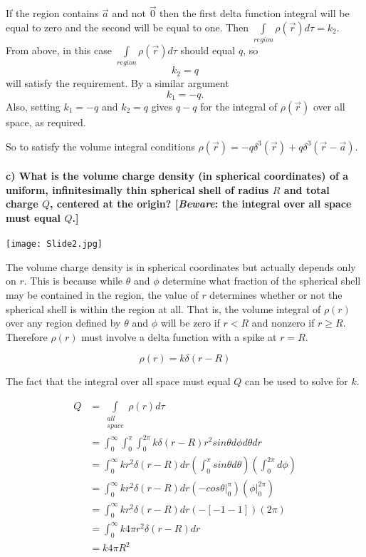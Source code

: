 \documentclass[12pt, oneside]{article}   	%
\begin{document}
If the region contains $\vec{a}$ and not $\vec{0}$ then the first delta function integral will be equal to zero and the second will be equal to one. Then $\int\limits_{region}\rho(\vec{r})d\tau=k_2$. From above, in this case $\int\limits_{region}\rho(\vec{r})d\tau$ should equal $q$, so 
\begin{equation}
k_2=q
\end{equation}
will satisfy the requirement. By a similar argument 
\begin{equation}
k_1=-q.
\end{equation}
Also, setting $k_1=-q$ and $k_2=q$ gives $q-q$ for the integral of $\rho(\vec{r})$ over all space, as required.

So to satisfy the volume integral conditions $\boxed{\rho({\vec{r}}) =-q\delta^3(\vec{r})+q\delta^3(\vec{r}-\vec{a})}$.
\paragraph*{\textbf{c) What is the volume charge density (in spherical coordinates) of a uniform, infinitesimally thin spherical shell of radius $R$ and total charge $Q$, centered at the origin? [\emph{Beware}: the integral over all space must equal $Q$.]}}

\begin{center}
\texttt{[image: Slide2.jpg]}
\end{center}

The volume charge density is in spherical coordinates but actually depends only on $r$. This is because while $\theta$ and $\phi$ determine what fraction of the spherical shell may be contained in the region, the value of $r$ determines whether or not the spherical shell is within the region at all. That is, the volume integral of $\rho(r)$ over any region defined by $\theta$ and $\phi$ will be zero if $r<R$ and nonzero if $r\geq R$. Therefore $\rho(r)$ must involve a delta function with a spike at $r=R$.

\begin{equation}
\rho(r)=k\delta(r-R)
\end{equation}
\pagebreak

The fact that the integral over all space must equal $Q$ can be used to solve for $k$.

\begin{equation}
\begin{split}
Q&=\int\limits_{\substack{all\\space}}\rho(r)d\tau\\
&=\int_0^\infty\int_0^\pi\int_0^{2\pi}k\delta(r-R)r^2sin\theta d\phi d\theta dr\\
&=\int_0^\infty kr^2\delta(r-R) dr\left(\int_0^\pi sin\theta d\theta\right)\left(\int_0^{2\pi} d\phi\right)\\
&=\int_0^\infty kr^2 \delta(r-R)dr\left(-cos\theta\big\vert_0^\pi \right)\left(\phi\big\vert_0^{2\pi}\right)\\
&=\int_0^\infty kr^2\delta(r-R) dr\left(-[-1-1]\right)(2\pi)\\
&=\int_0^\infty k4\pi r^2\delta(r-R) dr\\
&=k4\pi R^2
\end{split}
\end{equation}
\end{document}
